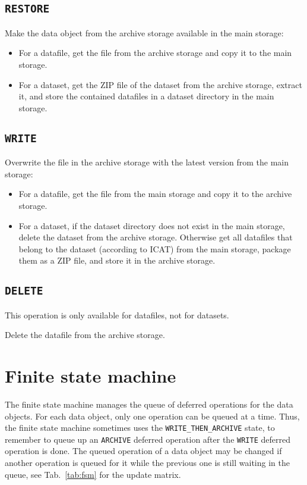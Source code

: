 \documentclass[paper=a4]{scrartcl}
\begin{document}
\subsection{\texttt{RESTORE}}
\label{sec:defops:restore}

Make the data object from the archive storage available in the
main storage:
\begin{itemize}[noitemsep,topsep=0pt]
\item For a datafile, get the file from the archive storage and
copy it to the main storage.
\item For a dataset, get the ZIP file of the dataset from the
archive storage, extract it, and store the contained datafiles in a
dataset directory in the main storage.
\end{itemize}

\subsection{\texttt{WRITE}}
\label{sec:defops:write}

Overwrite the file in the archive storage with the latest version
from the main storage:
\begin{itemize}[noitemsep,topsep=0pt]
\item For a datafile, get the file from the main storage and copy it
to the archive storage.
\item For a dataset, if the dataset directory does not exist in the
main storage, delete the dataset from the archive storage.  Otherwise
get all datafiles that belong to the dataset (according to ICAT) from
the main storage, package them as a ZIP file, and store it in the
archive storage.
\end{itemize}

\subsection{\texttt{DELETE}}
\label{sec:defops:delete}

This operation is only available for datafiles, not for datasets.

Delete the datafile from the archive storage.


\section{Finite state machine}
\label{sec:fsm}

The finite state machine manages the queue of deferred operations for
the data objects.  For each data object, only one operation can be
queued at a time.  Thus, the finite state machine sometimes uses the
\texttt{WRITE\_THEN\_ARCHIVE} state, to remember to queue up an
\texttt{ARCHIVE} deferred operation after the \texttt{WRITE} deferred
operation is done.  The queued operation of a data object may be
changed if another operation is queued for it while the previous one
is still waiting in the queue, see Tab.~\ref{tab:fsm} for the update
matrix.
\end{document}
